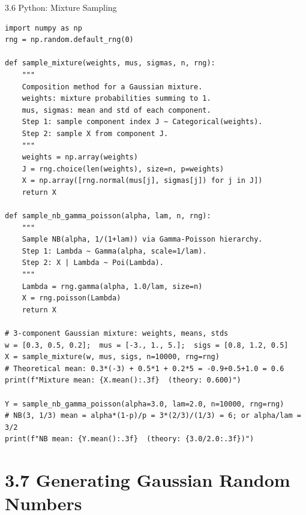 \documentclass[aspectratio=169,10pt]{beamer}
\begin{document}
\begin{frame}[fragile]{3.6 Python: Mixture Sampling}
\begin{lstlisting}[style=python, caption={Composition method for a Gaussian mixture and NB via Gamma-Poisson hierarchy}]
import numpy as np
rng = np.random.default_rng(0)

def sample_mixture(weights, mus, sigmas, n, rng):
    """
    Composition method for a Gaussian mixture.
    weights: mixture probabilities summing to 1.
    mus, sigmas: mean and std of each component.
    Step 1: sample component index J ~ Categorical(weights).
    Step 2: sample X from component J.
    """
    weights = np.array(weights)
    J = rng.choice(len(weights), size=n, p=weights)
    X = np.array([rng.normal(mus[j], sigmas[j]) for j in J])
    return X

def sample_nb_gamma_poisson(alpha, lam, n, rng):
    """
    Sample NB(alpha, 1/(1+lam)) via Gamma-Poisson hierarchy.
    Step 1: Lambda ~ Gamma(alpha, scale=1/lam).
    Step 2: X | Lambda ~ Poi(Lambda).
    """
    Lambda = rng.gamma(alpha, 1.0/lam, size=n)
    X = rng.poisson(Lambda)
    return X

# 3-component Gaussian mixture: weights, means, stds
w = [0.3, 0.5, 0.2];  mus = [-3., 1., 5.];  sigs = [0.8, 1.2, 0.5]
X = sample_mixture(w, mus, sigs, n=10000, rng=rng)
# Theoretical mean: 0.3*(-3) + 0.5*1 + 0.2*5 = -0.9+0.5+1.0 = 0.6
print(f"Mixture mean: {X.mean():.3f}  (theory: 0.600)")

Y = sample_nb_gamma_poisson(alpha=3.0, lam=2.0, n=10000, rng=rng)
# NB(3, 1/3) mean = alpha*(1-p)/p = 3*(2/3)/(1/3) = 6; or alpha/lam = 3/2
print(f"NB mean: {Y.mean():.3f}  (theory: {3.0/2.0:.3f})")
\end{lstlisting}
\end{frame}

\section{3.7 Generating Gaussian Random Numbers}
\end{document}
